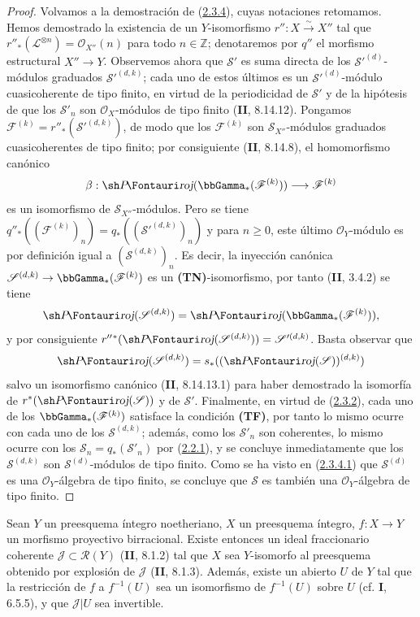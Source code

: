 \begin{proof}
Volvamos a la demostración de (\hyperref[III.2.3.4-fr]{2.3.4}), cuyas notaciones retomamos. Hemos demostrado la existencia de un $Y$-isomorfismo $r'':X\xrightarrow{\sim}X''$ tal que $r''_*(\mathcal L^{\otimes n})=\mathcal O_{X''}(n)$ para todo $n\in\mathbb Z$; denotaremos por $q''$ el morfismo estructural $X''\to Y$. Observemos ahora que $\mathcal S'$ es suma directa de los $\mathcal S'^{(d)}$-módulos graduados $\mathcal S'^{(d,k)}$; cada uno de estos últimos es un $\mathcal S'^{(d)}$-módulo cuasicoherente de tipo finito, en virtud de la periodicidad de $\mathcal S'$ y de la hipótesis de que los $\mathcal S'_n$ son $\mathcal O_X$-módulos de tipo finito (\textbf{II}, 8.14.12). Pongamos $\mathcal F^{(k)}=r''_*(\mathcal S'^{(d,k)})$, de modo que los $\mathcal F^{(k)}$ son $\mathcal S_{X''}$-módulos graduados cuasicoherentes de tipo finito; por consiguiente (\textbf{II}, 8.14.8), el homomorfismo canónico
\[
\beta:\shProj(\bbGamma_*(\mathcal F^{(k)}))
\longrightarrow\mathcal F^{(k)}
\]
es un isomorfismo de $\mathcal S_{X''}$-módulos. Pero se tiene $q''_*((\mathcal F^{(k)})_n)=q_*((\mathcal S'^{(d,k)})_n)$ y para $n\geq0$, este último $\mathcal O_Y$-módulo es por definición igual a $(\mathcal S^{(d,k)})_n$. Es decir, la inyección canónica $\mathcal S^{(d,k)}\to\bbGamma_*(\mathcal F^{(k)})$ es un \textbf{(TN)}-isomorfismo, por tanto (\textbf{II}, 3.4.2) se tiene \[
\shProj(\mathcal S^{(d,k)})
=\shProj(\bbGamma_*(\mathcal F^{(k)})),
\] y por consiguiente $r''{}^*(\shProj(\mathcal S^{(d,k)}))=\mathcal S'^{(d,k)}$. Basta observar que \[
\shProj(\mathcal S^{(d,k)})
=s_*((\shProj(\mathcal S))^{(d,k)})
\] salvo un isomorfismo canónico (\textbf{II}, 8.14.13.1) para haber demostrado la isomorfía de $r^*(\shProj(\mathcal S))$ y de $\mathcal S'$. Finalmente, en virtud de (\hyperref[III.2.3.2-fr]{2.3.2}), cada uno de los $\bbGamma_*(\mathcal F^{(k)})$ satisface la condición \textbf{(TF)}, por tanto lo mismo ocurre con cada uno de los $\mathcal S^{(d,k)}$; además, como los $\mathcal S'_n$ son coherentes, lo mismo ocurre con los $\mathcal S_n=q_*(\mathcal S'_n)$ por (\hyperref[III.2.2.1-fr]{2.2.1}), y se concluye inmediatamente que los $\mathcal S^{(d,k)}$ son $\mathcal S^{(d)}$-módulos de tipo finito. Como se ha visto en (\hyperref[III.2.3.4.1-fr]{2.3.4.1}) que $\mathcal S^{(d)}$ es una $\mathcal O_Y$-álgebra de tipo finito, se concluye que $\mathcal S$ es también una $\mathcal O_Y$-álgebra de tipo finito.
\end{proof}


\begin{proposition}[2.3.5]
\label{III.2.3.5-fr}
Sean $Y$ un preesquema íntegro noetheriano, $X$ un preesquema íntegro, $f:X\to Y$ un morfismo \textup{proyectivo birracional}. Existe entonces un ideal fraccionario coherente $\mathcal J\subset\mathcal R(Y)$ \textup{(\textbf{II}, 8.1.2)} tal que $X$ sea $Y$-isomorfo al preesquema obtenido por explosión de $\mathcal J$ \textup{(\textbf{II}, 8.1.3)}. Además, existe un abierto $U$ de $Y$ tal que la restricción de $f$ a $f^{-1}(U)$ sea un isomorfismo de $f^{-1}(U)$ sobre $U$ \textup{(cf. \textbf{I}, 6.5.5)}, y que $\mathcal J|U$ sea invertible.
\end{proposition}

